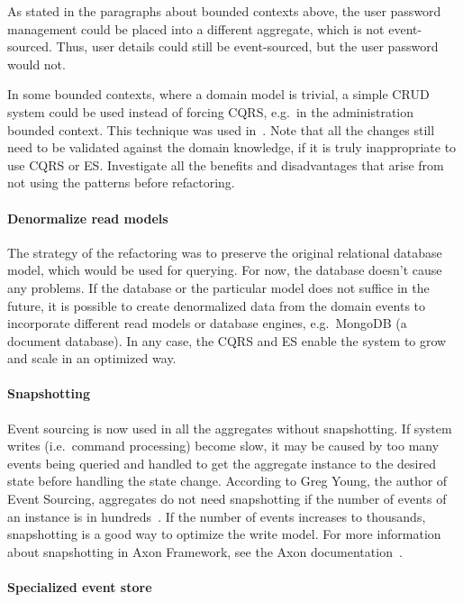 \documentclass{book}
\begin{document}
As stated in the paragraphs about bounded contexts above, the user
password management could be placed into a different aggregate, which is
not event-sourced. Thus, user details could still be event-sourced, but
the user password would not.

In some bounded contexts, where a domain model is trivial, a simple CRUD
system could be used instead of forcing CQRS, e.g.~in the administration
bounded context. This technique was used in~\cite{journey}. Note that
all the changes still need to be validated against the domain knowledge,
if it is truly inappropriate to use CQRS or ES. Investigate all the
benefits and disadvantages that arise from not using the patterns before
refactoring.

\paragraph{Denormalize read models}\label{denormalize-read-models}

The strategy of the refactoring was to preserve the original relational
database model, which would be used for querying. For now, the database
doesn't cause any problems. If the database or the particular model does
not suffice in the future, it is possible to create denormalized data
from the domain events to incorporate different read models or database
engines, e.g.~MongoDB (a document database). In any case, the CQRS and
ES enable the system to grow and scale in an optimized way.

\paragraph{Snapshotting}\label{snapshotting}

Event sourcing is now used in all the aggregates without snapshotting.
If system writes (i.e.~command processing) become slow, it may be caused
by too many events being queried and handled to get the aggregate
instance to the desired state before handling the state change.
According to Greg Young, the author of Event Sourcing, aggregates do not
need snapshotting if the number of events of an instance is in hundreds~\cite{greg-youtube}. If the number of events increases to thousands,
snapshotting is a good way to optimize the write model. For more
information about snapshotting in Axon Framework, see the Axon
documentation~\cite{axon-docs}.

\paragraph{Specialized event store}\label{specialized-event-store}
\end{document}
